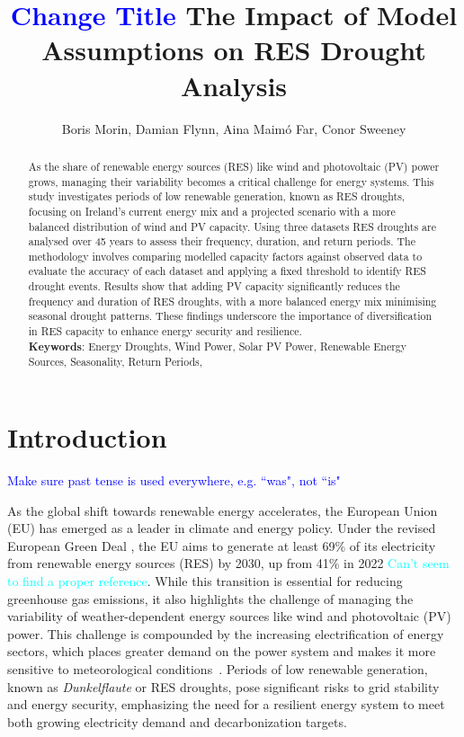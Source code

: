 \documentclass[a4paper, 11pt]{article}
\title{ \textcolor{blue}{Change Title} The Impact of Model Assumptions on RES Drought Analysis}
\author{Boris Morin, Damian Flynn, Aina Maimó Far, Conor Sweeney}
\begin{document}
\maketitle

\begin{abstract}

As the share of renewable energy sources (RES) like wind and photovoltaic (PV) power grows, managing their variability becomes a critical challenge for energy systems. This study investigates periods of low renewable generation, known as RES droughts, focusing on Ireland's current energy mix and a projected scenario with a more balanced distribution of wind and PV capacity. Using three datasets RES droughts are analysed over 45 years to assess their frequency, duration, and return periods. The methodology involves comparing modelled capacity factors against observed data to evaluate the accuracy of each dataset and applying a fixed threshold to identify RES drought events. Results show that adding PV capacity significantly reduces the frequency and duration of RES droughts, with a more balanced energy mix minimising seasonal drought patterns. These findings underscore the importance of diversification in RES capacity to enhance energy security and resilience. \\


\textbf{Keywords}: Energy Droughts, Wind Power, Solar PV Power, Renewable Energy Sources, Seasonality, Return Periods, 
\end{abstract}

\section{Introduction}
\label{sec:Intro}

\textcolor{blue}{Make sure past tense is used everywhere, e.g. ``was", not ``is"}

As the global shift towards renewable energy accelerates, the European Union (EU) has emerged as a leader in climate and energy policy. Under the revised European Green Deal \cite{greendeal2023report}, the EU aims to generate at least 69\% of its electricity from renewable energy sources (RES) by 2030, up from 41\% in 2022 \cite{europe2023stat} \textcolor{cyan}{Can't seem to find a proper reference}. While this transition is essential for reducing greenhouse gas emissions, it also highlights the challenge of managing the variability of weather-dependent energy sources like wind and photovoltaic (PV) power. This challenge is compounded by the increasing electrification of energy sectors, which places greater demand on the power system and makes it more sensitive to meteorological conditions~\cite{bloomfield2021, bloomfield2016, vanderWiel2019drought}. Periods of low renewable generation, known as \textit{Dunkelflaute} or RES droughts, pose significant risks to grid stability and energy security, emphasizing the need for a resilient energy system to meet both growing electricity demand and decarbonization targets.
\end{document}

